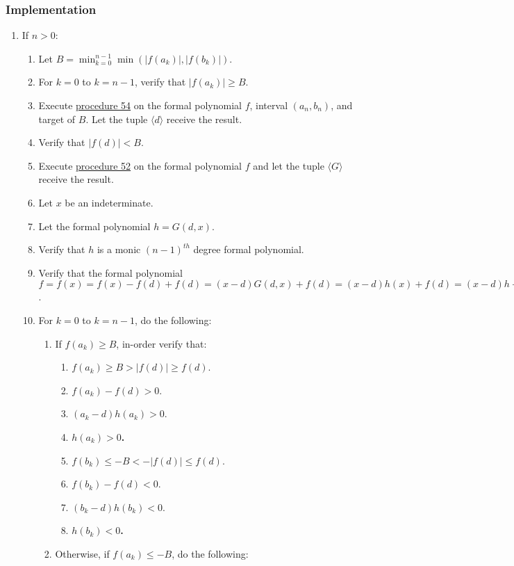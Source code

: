 \documentclass[twocolumn]{article}
\begin{document}
			\subsubsection{Implementation}
				\begin{enumerate}
					\item If $n>0$:
					\begin{enumerate}
						\item Let $B=\min_{k=0}^{n-1}\min(\lvert f(a_k)\rvert,\lvert f(b_k)\rvert)$.
						\item For $k=0$ to $k=n-1$, verify that $\lvert f(a_k)\rvert\ge B$.
						\item Execute \hyperref[sec:procedure 54]{procedure 54} on the formal polynomial $f$, interval $(a_n, b_n)$, and target of $B$. Let the tuple $\langle d\rangle$ receive the result.
						\item Verify that $\lvert f(d)\rvert<B$.
						\item Execute \hyperref[sec:procedure 52]{procedure 52} on the formal polynomial $f$ and let the tuple $\langle G\rangle$ receive the result.
						\item Let $x$ be an indeterminate.
						\item Let the formal polynomial $h=G(d,x)$.
						\item Verify that $h$ is a monic $(n-1)^{th}$ degree formal polynomial.
						\item Verify that the formal polynomial $f=f(x)=f(x)-f(d)+f(d)=(x-d)G(d,x)+f(d)=(x-d)h(x)+f(d)=(x-d)h+f(d)$.
						\item For $k=0$ to $k=n-1$, do the following:
						\begin{enumerate}
							\item If $f(a_k)\ge B$, in-order verify that:
							\begin{enumerate}
								\item $f(a_k)\ge B>\lvert f(d)\rvert\ge f(d)$.
								\item $f(a_k)-f(d)>0$.
								\item $(a_k-d)h(a_k)>0$.
								\item \textbf{$h(a_k)>0$.}
								\item $f(b_k)\le-B<-\lvert f(d)\rvert\le f(d)$.
								\item $f(b_k)-f(d)<0$.
								\item $(b_k-d)h(b_k)<0$.
								\item \textbf{$h(b_k)<0$.}
							\end{enumerate}
							\item Otherwise, if $f(a_k)\le -B$, do the following:

\end{enumerate}
\end{enumerate}
\end{enumerate}
\end{document}
